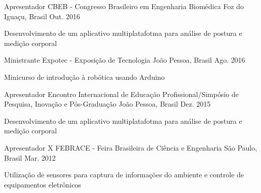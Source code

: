 \begin{cventries}
  
  \cventry
    {Apresentador} %
    {CBEB - Congresso Brasileiro em Engenharia Biomédica} %
    {Foz do Iguaçu, Brasil} %
    {Out. 2016} %
    {
      \begin{cvitems} %
        \item {Desenvolvimento de um aplicativo multiplatafotma para análise de postura e medição corporal}
      \end{cvitems}
    }

\cventry
{Ministrante} %
{Expotec - Exposição de Tecnologia} %
{João Pessoa, Brasil} %
{Ago. 2016} %
{
\begin{cvitems} %
\item {Minicurso de introdução à robótica usando Arduino}
\end{cvitems}
}

\cventry
{Apresentador} %
{Encontro Internacional de Educação Profissional/Simpósio de Pesquisa, Inovação e Pós-Graduação} %
{João Pessoa, Brasil} %
{Dez. 2015} %
{
\begin{cvitems} %
\item {Desenvolvimento de um aplicativo multiplatafotma para análise de postura e medição corporal}
\end{cvitems}
    }
  
  \cventry
    {Apresentador} %
    {X FEBRACE - Feira Brasileira de Ciência e Engenharia} %
    {São Paulo, Brasil} %
    {Mar. 2012} %
    {
      \begin{cvitems} %
        \item {Utilização de sensores para captura de informações do ambiente e controle de equipamentos eletrônicos}
      \end{cvitems}
    }
\end{cventries}